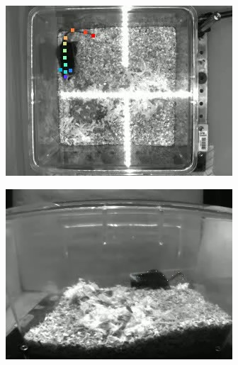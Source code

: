\begin{figure}[p]
  \centering
  \begin{subfigure}{0.45\textwidth}
    \centering
    \includegraphics[width=\textwidth, angle=-90]{figures/deeplabcut-top-example-4128-2020-12-02-1-00-37.jpg}
    \caption{}
    \label{fig:deeplabcut-top-example}
  \end{subfigure}
  \begin{subfigure}{0.45\textwidth}
    \centering
    \includegraphics[width=\textwidth]{figures/deeplabcut-lateral-example-4128-2020-12-02-1-00-37.jpg}
    \caption{}
    \label{fig:deeplabcut-lateral-example}
  \end{subfigure}
  \begin{subfigure}{0.45\textwidth}

\end{subfigure}
\end{figure}
